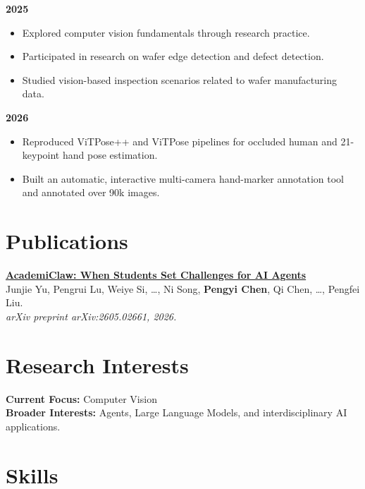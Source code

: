 \documentclass[10pt,a4paper]{article}
\newcommand{\blueitem}[1]{\textcolor{subtitleblue}{\textbf{#1}}}
\begin{document}
\blueitem{2025}
\begin{itemize}
    \item Explored computer vision fundamentals through research practice.
    \item Participated in research on wafer edge detection and defect detection.
    \item Studied vision-based inspection scenarios related to wafer manufacturing data.
\end{itemize}

\blueitem{2026}
\begin{itemize}
    \item Reproduced ViTPose++ and ViTPose pipelines for occluded human and 21-keypoint hand pose estimation.
    \item Built an automatic, interactive multi-camera hand-marker annotation tool and annotated over 90k images.
\end{itemize}

\vspace{0.3em}

\section*{Publications}

\href{https://arxiv.org/abs/2605.02661}{\blueitem{AcademiClaw: When Students Set Challenges for AI Agents}} \\
Junjie Yu, Pengrui Lu, Weiye Si, \ldots, Ni Song, \textbf{Pengyi Chen}, Qi Chen, \ldots, Pengfei Liu. \\
\textit{arXiv preprint arXiv:2605.02661, 2026.}

\vspace{0.3em}

\section*{Research Interests}

\textbf{Current Focus:} Computer Vision \\
\textbf{Broader Interests:} Agents, Large Language Models, and interdisciplinary AI applications.

\vspace{0.3em}

\section*{Skills}
\end{document}
